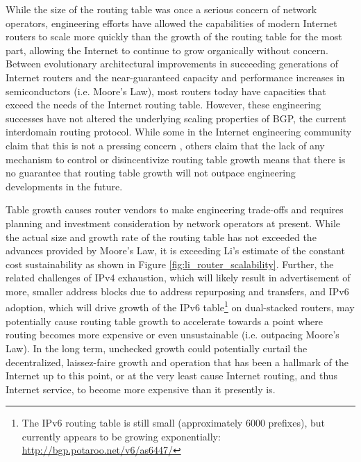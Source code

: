 While the size of the routing table was once a serious concern of network operators, engineering efforts have allowed the capabilities of modern Internet routers to scale more quickly than the growth of the routing table for the most part, allowing the Internet to continue to grow organically without concern. Between evolutionary architectural improvements in succeeding generations of Internet routers \cite{McKeown:2006kx} and the near-guaranteed capacity and performance increases in semiconductors (i.e. Moore's Law), most routers today have capacities that exceed the needs of the Internet routing table. However, these engineering successes have not altered the underlying scaling properties of BGP, the current interdomain routing protocol. While some in the Internet engineering community claim that this is not a pressing concern \cite{Huston:2011ys, Huston:2009dq}, others \cite{Li:2011vn} claim that the lack of any mechanism to control or disincentivize routing table growth means that there is no guarantee that routing table growth will not outpace engineering developments in the future.

Table growth causes router vendors to make engineering trade-offs \cite{Li:2011vn, Fall:2009fk} and requires planning and investment consideration by network operators \cite{Zhao:2010fu} at present. While the actual size and growth rate of the routing table has not exceeded the advances provided by Moore's Law, it is exceeding Li's estimate of the constant cost sustainability as shown in Figure \ref{fig:li_router_scalability}. Further, the related challenges of IPv4 exhaustion, which will likely result in advertisement of more, smaller address blocks due to address repurposing and transfers, and IPv6 adoption, which will drive growth of the IPv6 table\footnote{The IPv6 routing table is still small (approximately 6000 prefixes), but currently appears to be growing exponentially: \url{http://bgp.potaroo.net/v6/as6447/}} on dual-stacked routers, may potentially cause routing table growth to accelerate towards a point where routing becomes more expensive or even unsustainable (i.e. outpacing Moore's Law). In the long term, unchecked growth could potentially curtail the decentralized, laissez-faire growth and operation that has been a hallmark of the Internet up to this point, or at the very least cause Internet routing, and thus Internet service, to become more expensive than it presently is.

